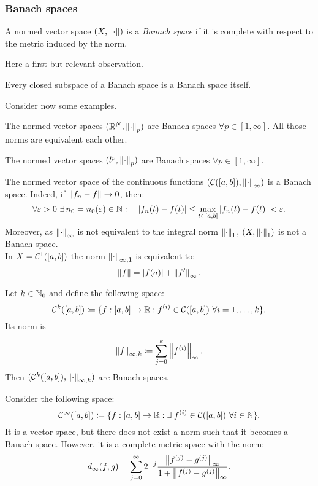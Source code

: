 \subsubsection{Banach spaces}

\begin{defn}
	A normed vector space $(X,\left\lVert\cdot\right\rVert)$ is a \emph{Banach space} if it is complete\footnotemark{} with respect to the metric induced by the norm.
\end{defn}

Here a first but relevant observation.
\begin{prop}
	Every closed subspace of a Banach space is a Banach space itself.
\end{prop}

Consider now some examples.
\begin{exam}
	The normed vector spaces $(\mathbb R^N, \left\lVert\cdot\right\rVert_p)$ are Banach spaces $\forall p \in [1,\infty]$. All those norms are equivalent each other.
\end{exam}
\begin{exam}
	The normed vector spaces $(l^p,\left\lVert\cdot\right\rVert_p)$ are Banach spaces $\forall p \in [1,\infty]$.
\end{exam}
\begin{exam}
	The normed vector space of the continuous functions $(\mathcal C([a,b]),\left\lVert\cdot\right\rVert_\infty)$ is a Banach space. Indeed, if $\left\lVert f_n-f\right\rVert\to 0$, then:
	$$
	\forall \varepsilon 
	> 0 
	\ \exists
	\, n_0
	=n_0(\varepsilon) 
	\in \mathbb N 
	: \quad	|f_n(t)-f(t)|
	\leq \max_{t \in [a,b]} |f_n(t)-f(t)| 
	< \varepsilon
	.
	$$
	Moreover, as $\left\lVert\cdot\right\rVert_\infty$ is not equivalent to the integral norm $\left\lVert\cdot\right\rVert_1$, $(X, \left\lVert\cdot\right\rVert_1)$ is not a Banach space.\\
	In $X=\mathcal C^1([a,b])$ the norm $\left\lVert\cdot\right\rVert_{\infty, 1}$ is equivalent to:
	$$
	\left\lVert f\right\rVert 
	= |f(a)| + \left\lVert f'\right\rVert_\infty
	.
	$$
\end{exam}
\begin{exam}
	Let $k\in \mathbb N_0$ and define the following space:
	$$
	\Cc^k([a,b]) 
	\coloneqq \{
		f:[a,b]\to \RR : 
		f^{(i)}\in \Cc([a,b]) \ 
		\forall i = 1,\ldots,k 
	\}
	.
	$$
	Its norm is
	$$
	\left\lVert f\right\rVert_{\infty,k}
	\coloneqq 
	\sum_{j=0}^{k} \left\lVert f^{(i)}\right\rVert_\infty
	.
	$$
	Then $(\mathcal C^k([a,b]),\left\lVert\cdot\right\rVert_{\infty,k})$ are Banach spaces.
\end{exam}
\begin{exam}
	Consider the following space:
	$$\mathcal C^\infty([a,b]) \coloneqq \{f:[a,b]\to \mathbb R : \exists\; f^{(i)} \in \mathcal C ([a,b]) \ \forall i\in \mathbb N \}.$$
	It is a vector space, but there does not exist a norm such that it becomes a Banach space. However, it is a complete metric space with the norm:
	$$d_\infty(f,g) = \sum_{j=0}^\infty 2^{-j} \frac{\left\lVert f^{(j)}-g^{(j)}\right\rVert_\infty}{1+\left\lVert f^{(j)}-g^{(j)}\right\rVert_\infty}.$$
\end{exam}

